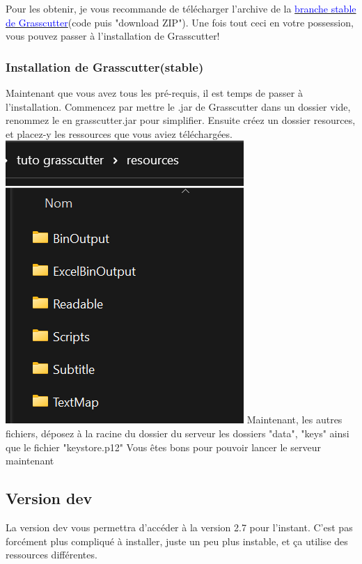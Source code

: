 \documentclass{article}
\begin{document}
Pour les obtenir, je vous recommande de télécharger l'archive de la \href{https://github.com/Grasscutters/Grasscutter/tree/stable}{\textcolor{blue}{branche stable de Grasscutter}}(code puis "download ZIP").\newline
Une fois tout ceci en votre possession, vous pouvez passer à l'installation de Grasscutter!

\subsubsection{Installation de Grasscutter(stable)}
Maintenant que vous avez tous les pré-requis, il est temps de passer à l'installation.\newline
Commencez par mettre le .jar de Grasscutter dans un dossier vide, renommez le en grasscutter.jar pour simplifier.\newline
Ensuite créez un dossier resources, et placez-y les ressources que vous aviez téléchargées.\newline
\includegraphics[scale=1]{img/disp_resources.png}\newline
Maintenant, les autres fichiers, déposez à la racine du dossier du serveur les dossiers "data", "keys" ainsi que le fichier "keystore.p12"\newline
Vous êtes bons pour pouvoir lancer le serveur maintenant

\subsection{Version dev}
La version dev vous permettra d'accéder à la version 2.7 pour l'instant. C'est pas forcément plus compliqué à installer, juste un peu plus instable, et ça utilise des ressources différentes.
\end{document}
